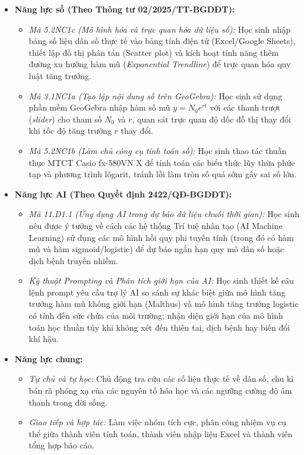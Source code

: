 \documentclass[12pt, a4paper]{article}
\begin{document}
\begin{itemize}[leftmargin=1.2cm]
    \item \textbf{Năng lực số (Theo Thông tư 02/2025/TT-BGDĐT):}
    \begin{itemize}[leftmargin=0.6cm]
        \item \textit{Mã 5.2NC1c (Mô hình hóa và trực quan hóa dữ liệu số):} Học sinh nhập bảng số liệu dân số thực tế vào bảng tính điện tử (Excel/Google Sheets), thiết lập đồ thị phân tán (Scatter plot) và kích hoạt tính năng thêm đường xu hướng hàm mũ (\textit{Exponential Trendline}) để trực quan hóa quy luật tăng trưởng.
        \item \textit{Mã 3.1NC1a (Tạo lập nội dung số trên GeoGebra):} Học sinh sử dụng phần mềm GeoGebra nhập hàm số mũ $y = N_0 e^{rt}$ với các thanh trượt (\textit{slider}) cho tham số $N_0$ và $r$, quan sát trực quan độ dốc đồ thị thay đổi khi tốc độ tăng trưởng $r$ thay đổi.
        \item \textit{Mã 5.2NC1b (Làm chủ công cụ tính toán số):} Học sinh thao tác thuần thục MTCT Casio fx-580VN X để tính toán các biểu thức lũy thừa phức tạp và phương trình lôgarit, tránh lỗi làm tròn số quá sớm gây sai số lớn.
    \end{itemize}

    \item \textbf{Năng lực AI (Theo Quyết định 2422/QĐ-BGDĐT):}
    \begin{itemize}[leftmargin=0.6cm]
        \item \textit{Mã 11.D1.1 (Ứng dụng AI trong dự báo dữ liệu chuỗi thời gian):} Học sinh nêu được ý tưởng về cách các hệ thống Trí tuệ nhân tạo (AI Machine Learning) sử dụng các mô hình hồi quy phi tuyến tính (trong đó có hàm mũ và hàm sigmoid/logistic) để dự báo ngắn hạn quy mô dân số hoặc dịch bệnh truyền nhiễm.
        \item \textit{Kỹ thuật Prompting và Phân tích giới hạn của AI:} Học sinh thiết kế câu lệnh prompt yêu cầu trợ lý AI so sánh sự khác biệt giữa mô hình tăng trưởng hàm mũ không giới hạn (Malthus) và mô hình tăng trưởng logistic có tính đến sức chứa của môi trường; nhận diện giới hạn của mô hình toán học thuần túy khi không xét đến thiên tai, dịch bệnh hay biến đổi khí hậu.
    \end{itemize}

    \item \textbf{Năng lực chung:}
    \begin{itemize}[leftmargin=0.6cm]
        \item \textit{Tự chủ và tự học:} Chủ động tra cứu các số liệu thực tế về dân số, chu kì bán rã phóng xạ của các nguyên tố hóa học và các ngưỡng cường độ âm thanh trong đời sống.
        \item \textit{Giao tiếp và hợp tác:} Làm việc nhóm tích cực, phân công nhiệm vụ cụ thể giữa thành viên tính toán, thành viên nhập liệu Excel và thành viên tổng hợp báo cáo.
    \end{itemize}
\end{itemize}
\end{document}
